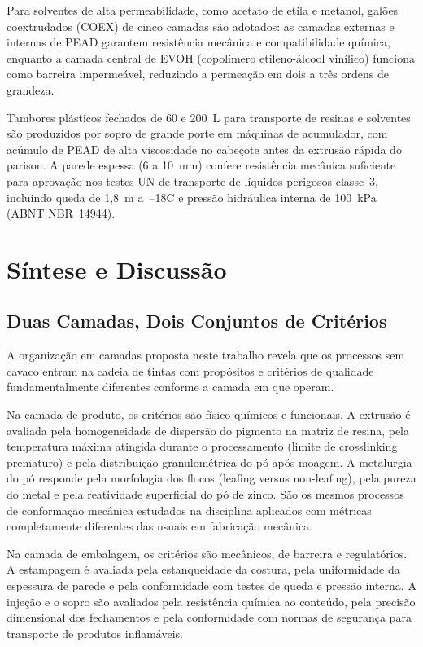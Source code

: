 \documentclass[
  12pt,
  a4paper,
  oneside,
  brazil,
  chapter=TITLE
]{article}
\newcommand{\secbreak}{\clearpage}
\let\oldsection\section
\renewcommand{\section}{\secbreak\oldsection}
\begin{document}
Para solventes de alta permeabilidade, como acetato de etila e metanol, galões
coextrudados (COEX) de cinco camadas são adotados: as camadas externas e internas
de PEAD garantem resistência mecânica e compatibilidade química, enquanto a camada
central de EVOH (copolímero etileno-álcool vinílico) funciona como barreira
impermeável, reduzindo a permeação em dois a três ordens de grandeza.

Tambores plásticos fechados de 60 e 200~L para transporte de resinas e solventes
são produzidos por sopro de grande porte em máquinas de acumulador, com acúmulo
de PEAD de alta viscosidade no cabeçote antes da extrusão rápida do parison. A
parede espessa (6 a 10~mm) confere resistência mecânica suficiente para aprovação
nos testes UN de transporte de líquidos perigosos classe~3, incluindo queda de
1,8~m a~--18\textdegree{}C e pressão hidráulica interna de 100~kPa (ABNT NBR~14944).

\section{Síntese e Discussão}\label{sintese}

\subsection{Duas Camadas, Dois Conjuntos de Critérios}\label{duas-camadas}

A organização em camadas proposta neste trabalho revela que os processos sem
cavaco entram na cadeia de tintas com propósitos e critérios de qualidade
fundamentalmente diferentes conforme a camada em que operam.

Na camada de produto, os critérios são físico-químicos e funcionais. A extrusão é
avaliada pela homogeneidade de dispersão do pigmento na matriz de resina, pela
temperatura máxima atingida durante o processamento (limite de crosslinking
prematuro) e pela distribuição granulométrica do pó após moagem. A metalurgia do
pó responde pela morfologia dos flocos (leafing versus non-leafing), pela pureza
do metal e pela reatividade superficial do pó de zinco. São os mesmos processos
de conformação mecânica estudados na disciplina aplicados com métricas
completamente diferentes das usuais em fabricação mecânica.

Na camada de embalagem, os critérios são mecânicos, de barreira e regulatórios.
A estampagem é avaliada pela estanqueidade da costura, pela uniformidade da
espessura de parede e pela conformidade com testes de queda e pressão interna. A
injeção e o sopro são avaliados pela resistência química ao conteúdo, pela
precisão dimensional dos fechamentos e pela conformidade com normas de segurança
para transporte de produtos inflamáveis.
\end{document}
